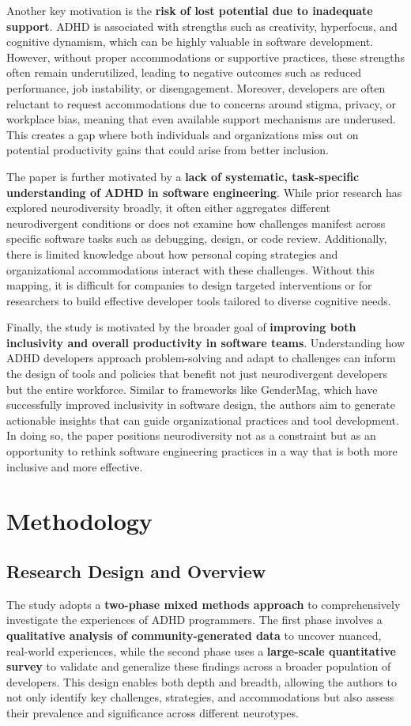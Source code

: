 Another key motivation is the \textbf{risk of lost potential due to inadequate support}. ADHD is associated with strengths such as creativity, hyperfocus, and cognitive dynamism, which can be highly valuable in software development. However, without proper accommodations or supportive practices, these strengths often remain underutilized, leading to negative outcomes such as reduced performance, job instability, or disengagement. Moreover, developers are often reluctant to request accommodations due to concerns around stigma, privacy, or workplace bias, meaning that even available support mechanisms are underused. This creates a gap where both individuals and organizations miss out on potential productivity gains that could arise from better inclusion.

The paper is further motivated by a \textbf{lack of systematic, task-specific understanding of ADHD in software engineering}. While prior research has explored neurodiversity broadly, it often either aggregates different neurodivergent conditions or does not examine how challenges manifest across specific software tasks such as debugging, design, or code review. Additionally, there is limited knowledge about how personal coping strategies and organizational accommodations interact with these challenges. Without this mapping, it is difficult for companies to design targeted interventions or for researchers to build effective developer tools tailored to diverse cognitive needs.

Finally, the study is motivated by the broader goal of \textbf{improving both inclusivity and overall productivity in software teams}. Understanding how ADHD developers approach problem-solving and adapt to challenges can inform the design of tools and policies that benefit not just neurodivergent developers but the entire workforce. Similar to frameworks like GenderMag, which have successfully improved inclusivity in software design, the authors aim to generate actionable insights that can guide organizational practices and tool development. In doing so, the paper positions neurodiversity not as a constraint but as an opportunity to rethink software engineering practices in a way that is both more inclusive and more effective.

\section{Methodology}
\subsection{Research Design and Overview}
The study adopts a \textbf{two-phase mixed methods approach} to comprehensively investigate the experiences of ADHD programmers. The first phase involves a \textbf{qualitative analysis of community-generated data} to uncover nuanced, real-world experiences, while the second phase uses a \textbf{large-scale quantitative survey} to validate and generalize these findings across a broader population of developers. This design enables both depth and breadth, allowing the authors to not only identify key challenges, strategies, and accommodations but also assess their prevalence and significance across different neurotypes.

